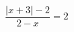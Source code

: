 \begin{ex}[type=equation]
	\begin{condition}
		$\dfrac{\big|x + 3\big| - 2}{2 - x}= 2$
	\end{condition}
	\answer{ $\left\{ 1 \right\}$}
\end{ex}
